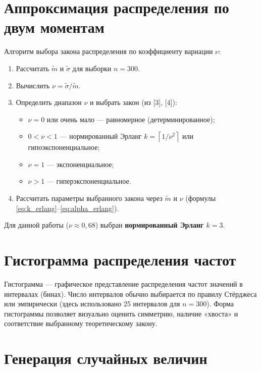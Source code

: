\documentclass[a4paper,12pt]{article}
\begin{document}
\section{Аппроксимация распределения по двум моментам}

Алгоритм выбора закона распределения по коэффициенту вариации $\nu$:

\begin{enumerate}
    \item Рассчитать $\tilde{m}$ и $\tilde{\sigma}$ для выборки $n=300$.
    \item Вычислить $\nu = \tilde{\sigma}/\tilde{m}$.
    \item Определить диапазон $\nu$ и выбрать закон (из [3], [4]):
    \begin{itemize}
        \item $\nu = 0$ или очень мало — равномерное (детерминированное);
        \item $0 < \nu < 1$ — нормированный Эрланг $k = \left\lceil 1/\nu^2 \right\rceil$ или гипоэкспоненциальное;
        \item $\nu = 1$ — экспоненциальное;
        \item $\nu > 1$ — гиперэкспоненциальное.
    \end{itemize}
    \item Рассчитать параметры выбранного закона через $\tilde{m}$ и $\nu$ (формулы \eqref{eq:k_erlang}–\eqref{eq:alpha_erlang}).
\end{enumerate}

Для данной работы ($\nu \approx 0{,}68$) выбран \textbf{нормированный Эрланг $k=3$}.

\section{Гистограмма распределения частот}
Гистограмма — графическое представление распределения частот значений в интервалах (бинах).
Число интервалов обычно выбирается по правилу Стёрджеса или эмпирически (здесь использовано 25 интервалов для $n=300$).
Форма гистограммы позволяет визуально оценить симметрию, наличие «хвоста» и соответствие выбранному теоретическому закону.

\section{Генерация случайных величин}
\end{document}
